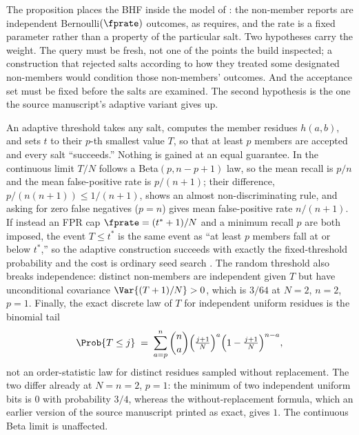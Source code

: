 The proposition places the BHF inside the model of
: the non-member reports are independent
Bernoulli$(\fprate)$ outcomes, as 
requires, and the rate is a fixed parameter rather than a property of
the particular salt. Two hypotheses carry the weight. The query must be
fresh, not one of the points the build inspected; a construction that
rejected salts according to how they treated some designated
non-members would condition those non-members' outcomes. And the
acceptance set must be fixed before the salts are examined. The second
hypothesis is the one the source manuscript's adaptive variant gives up.

\begin{remark}
\label{rem:adaptive-threshold}
An adaptive threshold takes any salt, computes
the member residues $h(a, b)$, and sets $t$ to their $p$-th smallest
value $T$, so that at least $p$ members are accepted and every salt
``succeeds.'' Nothing is gained at an equal guarantee. In the continuous
limit $T/N$ follows a Beta$(p, n - p + 1)$ law, so the mean recall is
$p/n$ and the mean false-positive rate is $p/(n + 1)$; their difference,
$p / (n(n + 1)) \le 1/(n+1)$, shows an almost non-discriminating rule, and
asking for zero false negatives ($p = n$) gives mean false-positive rate
$n/(n+1)$. If instead an FPR cap $\fprate = (t^{*} + 1)/N$ and a minimum
recall $p$ are both imposed, the event $T \le t^{*}$ is the same event as
``at least $p$ members fall at or below $t^{*}$,'' so the adaptive
construction succeeds with exactly the fixed-threshold probability and
the cost is ordinary seed search \parencite{lehmann-et-al-2025}. The
random threshold also breaks independence: distinct non-members are
independent given $T$ but have unconditional covariance $\Var{(T +
1)/N} > 0$, which is $3/64$ at $N = 2$, $n = 2$, $p = 1$. Finally, the
exact discrete law of $T$ for independent uniform residues is the
binomial tail
\[
  \Prob{T \le j} \;=\; \sum_{a = p}^{n} \binom{n}{a}
  \Bigl( \tfrac{j + 1}{N} \Bigr)^{a}
  \Bigl( 1 - \tfrac{j + 1}{N} \Bigr)^{n - a},
\]
not an order-statistic law for distinct residues sampled without
replacement. The two differ already at $N = n =
2$, $p = 1$: the minimum of two independent uniform bits is $0$ with
probability $3/4$, whereas the without-replacement formula, which an
earlier version of the source manuscript printed as exact, gives
$1$. The continuous Beta
limit is unaffected.
\end{remark}

